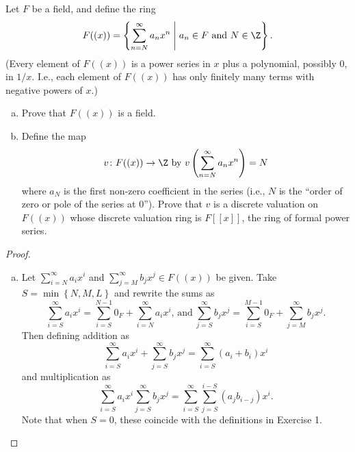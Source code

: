 \documentclass[10pt]{amsart}
\begin{document}
\begin{thm}
  Let $F$ be a field, and define the ring $$F((x)) = \left\{ \sum_{n=N}^\infty a_nx^n \;\middle\vert\; a_n \in F\ \text{and}\ N \in \Z\right\}.$$
  (Every element of $F((x))$ is a power series in $x$ plus a polynomial, possibly 0, in $1/x$.  
  I.e., each element of $F((x))$ has only finitely many terms with negative powers of $x$.)
  \begin{enumerate}[(a)]
  \item
    Prove that $F((x))$ is a field.
  \item
    Define the map 
    $$v \colon F((x)) \rightarrow \Z\ \text{by}\ v\left(\sum_{n=N}^\infty a_nx^n\right) = N$$
    where $a_N$ is the first non-zero coefficient in the series (i.e., $N$ is the ``order of zero or pole of the series at 0'').
    Prove that $v$ is a discrete valuation on $F((x))$ whose discrete valuation ring is $F[[x]]$, the ring of formal power series.
  \end{enumerate}
  \begin{proof}
    \begin{enumerate}[(a)]
    \item
      Let $\sum_{i=N}^\infty a_ix^i$ and $\sum_{j=M}^\infty b_jx^j \in F((x))$ be given.
      Take $S = \min\left\{N, M, L\right\}$ and rewrite the sums as
      $$\sum_{i=S}^\infty a_ix^i = \sum_{i=S}^{N-1} 0_F + \sum_{i=N}^\infty a_ix^i,\, \text{and}\ \sum_{j=S}^\infty b_jx^j = \sum_{i=S}^{M-1} 0_F + \sum_{j=M}^\infty b_jx^j.$$
      Then defining addition as
      $$\sum_{i=S}^\infty a_ix^i + \sum_{j=S}^\infty b_jx^j = \sum_{i=S}^\infty (a_i + b_i)x^i$$ 
      and multiplication as
      $$\sum_{i=S}^\infty a_ix^i \sum_{j=S}^\infty b_jx^j = \sum_{i=S}^\infty \sum_{j = S}^{i-S} \left(a_jb_{i-j}\right)x^i.$$
      Note that when $S = 0$, these coincide with the definitions in Exercise 1.
      

\end{enumerate}
\end{proof}
\end{thm}
\end{document}
